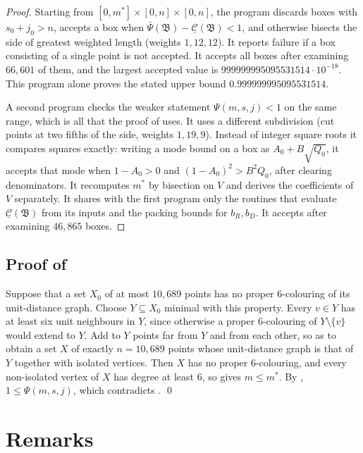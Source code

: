 \documentclass[11pt,colorlinks]{charlie}
\begin{document}
\begin{proof}
Starting from $[0,m^*]\times[0,n]\times[0,n]$, the program discards boxes with $s_0+j_0>n$, accepts a box when $\bar\Psi(\mathfrak B)-\underline{\mathcal C}(\mathfrak B)<1$, and otherwise bisects the side of greatest weighted length (weights $1,12,12$). It reports failure if a box consisting of a single point is not accepted. It accepts all boxes after examining $66{,}601$ of them, and the largest accepted value is $999999995095531514\cdot10^{-18}$. This program alone proves the stated upper bound $0.999999995095531514$.

A second program checks the weaker statement $\Psi(m,s,j)<1$ on the same range, which is all that the proof of  uses. It uses a different subdivision (cut points at two fifths of the side, weights $1,19,9$). Instead of integer square roots it compares squares exactly: writing a mode bound on a box as $A_0+B\sqrt{Q_0}$, it accepts that mode when $1-A_0>0$ and $(1-A_0)^2>B^2Q_0$, after clearing denominators. It recomputes $m^*$ by bisection on $V$ and derives the coefficients of $V$ separately. It shares with the first program only the routines that evaluate $\underline{\mathcal C}(\mathfrak B)$ from its inputs and the packing bounds for $b_R,b_D$. It accepts after examining $46{,}865$ boxes.
\end{proof}

\subsection{Proof of }
Suppose that a set $X_0$ of at most $10{,}689$ points has no proper $6$-colouring of its unit-distance graph. Choose $Y\subseteq X_0$ minimal with this property. Every $v\in Y$ has at least six unit neighbours in $Y$, since otherwise a proper $6$-colouring of $Y\setminus\{v\}$ would extend to $Y$. Add to $Y$ points far from $Y$ and from each other, so as to obtain a set $X$ of exactly $n=10{,}689$ points whose unit-distance graph is that of $Y$ together with isolated vertices. Then $X$ has no proper $6$-colouring, and every non-isolated vertex of $X$ has degree at least $6$, so  gives $m\le m^*$. By , $1\le\Psi(m,s,j)$, which contradicts . \qed

\section{Remarks}\label{sec:remarks}
\end{document}
